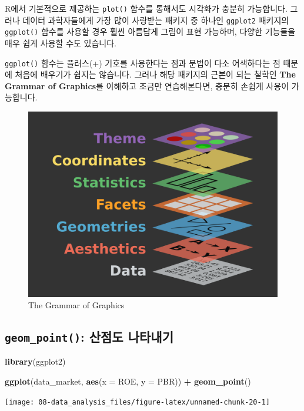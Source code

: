 \documentclass[12pt,]{book}
\newenvironment{Shaded}{\begin{snugshade}}{\end{snugshade}}
\newcommand{\DataTypeTok}[1]{\textcolor[rgb]{0.13,0.29,0.53}{#1}}
\newcommand{\KeywordTok}[1]{\textcolor[rgb]{0.13,0.29,0.53}{\textbf{#1}}}
\newcommand{\NormalTok}[1]{#1}
\newcommand{\OperatorTok}[1]{\textcolor[rgb]{0.81,0.36,0.00}{\textbf{#1}}}
\newcommand{\StringTok}[1]{\textcolor[rgb]{0.31,0.60,0.02}{#1}}
\begin{document}
R에서 기본적으로 제공하는 \texttt{plot()} 함수를 통해서도 시각화가 충분히 가능합니다. 그러나 데이터 과학자들에게 가장 많이 사랑받는 패키지 중 하나인 \texttt{ggplot2} 패키지의 \texttt{ggplot()} 함수를 사용할 경우 훨씬 아름답게 그림이 표현 가능하며, 다양한 기능들을 매우 쉽게 사용할 수도 있습니다.

\texttt{ggplot()} 함수는 플러스(+) 기호를 사용한다는 점과 문법이 다소 어색하다는 점 때문에 처음에 배우기가 쉽지는 않습니다. 그러나 해당 패키지의 근본이 되는 철학인 \textbf{The Grammar of Graphics}를 이해하고 조금만 연습해본다면, 충분히 손쉽게 사용이 가능합니다.

\begin{figure}[h]

{\centering \includegraphics[width=0.5\linewidth]{images/data_analysis_gg} 

}

\caption{The Grammar of Graphics}\label{fig:unnamed-chunk-19}
\end{figure}

\hypertarget{geom_point--}{%
\subsection{\texorpdfstring{\texttt{geom\_point()}: 산점도 나타내기}{geom\_point(): 산점도 나타내기}}\label{geom_point--}}

\begin{Shaded}
\begin{Highlighting}[]
\KeywordTok{library}\NormalTok{(ggplot2)}

\KeywordTok{ggplot}\NormalTok{(data_market, }\KeywordTok{aes}\NormalTok{(}\DataTypeTok{x =}\NormalTok{ ROE, }\DataTypeTok{y =}\NormalTok{ PBR)) }\OperatorTok{+}
\StringTok{  }\KeywordTok{geom_point}\NormalTok{()}
\end{Highlighting}
\end{Shaded}

\begin{center}\texttt{[image: 08-data\_analysis\_files/figure-latex/unnamed-chunk-20-1]} \end{center}
\end{document}
